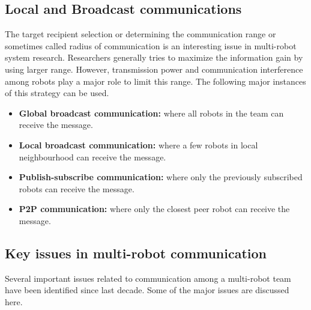 \subsection*{Local and Broadcast communications}
The target recipient selection or determining the communication range or sometimes called radius of communication is an interesting issue in multi-robot system research. Researchers generally tries to maximize the information gain by using larger range. However, transmission power and communication interference among robots play a major role to limit this range. The following major instances of this strategy can be used.
\begin{itemize}
\item \textbf{Global broadcast communication:} where all robots in the team can receive the message.
\item \textbf{Local broadcast communication:} where a few robots in local neighbourhood can receive the message.
\item \textbf{Publish-subscribe communication:} where only the previously subscribed robots can receive the message.
\item \textbf{P2P communication:} where only the closest peer robot can receive the message.
\end{itemize}
\subsection{Key issues in multi-robot communication}
\label{bg:mrs-comm:key-issues}
Several important issues related to communication among a multi-robot team have been identified since last decade. Some of the major issues are discussed here.

